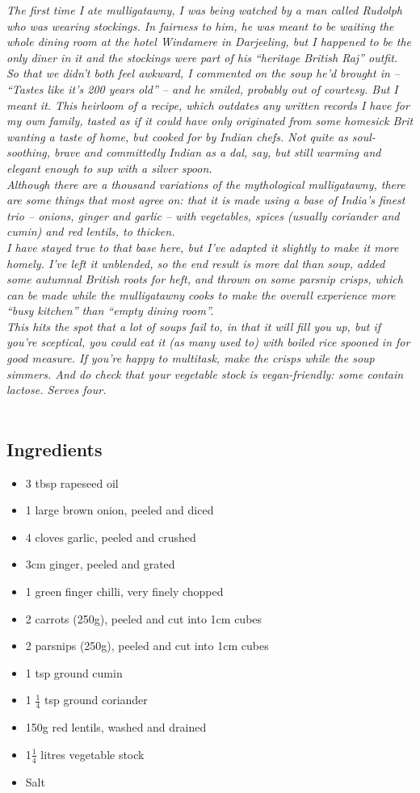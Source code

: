 \documentclass{book}
\begin{document}
\emph{The first time I ate mulligatawny, I was being watched by a man called Rudolph who was wearing stockings. In fairness to him, he was meant to be waiting the whole dining room at the hotel Windamere in Darjeeling, but I happened to be the only diner in it and the stockings were part of his “heritage British Raj” outfit.\\ 
So that we didn’t both feel awkward, I commented on the soup he’d brought in – “Tastes like it’s 200 years old” – and he smiled, probably out of courtesy. But I meant it. This heirloom of a recipe, which outdates any written records I have for my own family, tasted as if it could have only originated from some homesick Brit wanting a taste of home, but cooked for by Indian chefs. Not quite as soul-soothing, brave and committedly Indian as a dal, say, but still warming and elegant enough to sup with a silver spoon.\\ 
Although there are a thousand variations of the mythological mulligatawny, there are some things that most agree on: that it is made using a base of India’s finest trio – onions, ginger and garlic – with vegetables, spices (usually coriander and cumin) and red lentils, to thicken.\\ 
I have stayed true to that base here, but I’ve adapted it slightly to make it more homely. I’ve left it unblended, so the end result is more dal than soup, added some autumnal British roots for heft, and thrown on some parsnip crisps, which can be made while the mulligatawny cooks to make the overall experience more “busy kitchen” than “empty dining room”.\\ 
This hits the spot that a lot of soups fail to, in that it will fill you up, but if you’re sceptical, you could eat it (as many used to) with boiled rice spooned in for good measure. If you’re happy to multitask, make the crisps while the soup simmers. And do check that your vegetable stock is vegan-friendly: some contain lactose. Serves four.}\\\\ 
\subsection*{Ingredients}
\begin{itemize}
\item 3 tbsp rapeseed oil
\item 1 large brown onion, peeled and diced
\item 4 cloves garlic, peeled and crushed
\item 3cm ginger, peeled and grated
\item 1 green finger chilli, very finely chopped
\item 2 carrots (250g), peeled and cut into 1cm cubes
\item 2 parsnips (250g), peeled and cut into 1cm cubes
\item 1 tsp ground cumin
\item 1 $\frac{1}{4}$ tsp ground coriander
\item 150g red lentils, washed and drained
\item 1$\frac{1}{4}$ litres vegetable stock
\item Salt
\end{itemize}
\end{document}
